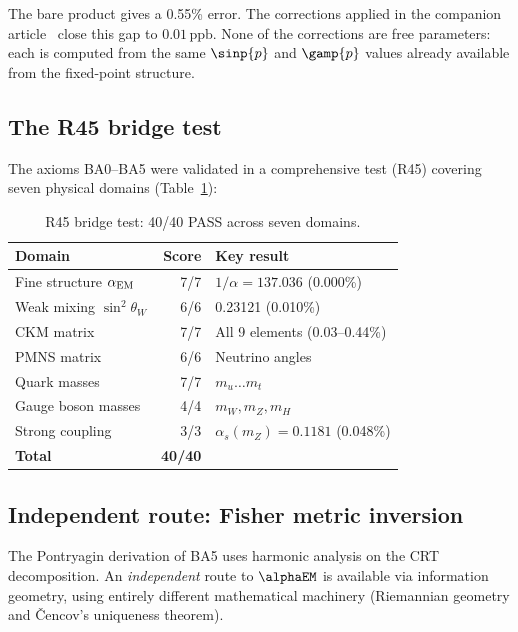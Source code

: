 \documentclass[12pt,a4paper]{article}
\begin{document}
The bare product gives a 0.55\% error. The corrections applied in
the companion article~\cite{companion_physics} close this gap to $0.01\,\mathrm{ppb}$. None of the corrections
are free parameters: each is computed from the same $\sinp{p}$ and
$\gamp{p}$ values already available from the fixed-point structure.

\subsection{The R45 bridge test}
\label{sec:ch9_R45}

The axioms BA0--BA5 were validated in a comprehensive test
(R45) covering seven physical domains (Table~\ref{tab:R45}):

\begin{table}[htbp]
\centering
\caption{R45 bridge test: 40/40 PASS across seven domains.}
\label{tab:R45}
\begin{tabular}{lrl}
\toprule
\textbf{Domain} & \textbf{Score} & \textbf{Key result} \\
\midrule
Fine structure $\alpha_{\rm EM}$ & 7/7 & $1/\alpha = 137.036$ (0.000\%) \\
Weak mixing $\sin^2\theta_W$ & 6/6 & 0.23121 (0.010\%) \\
CKM matrix & 7/7 & All 9 elements (0.03--0.44\%) \\
PMNS matrix & 6/6 & Neutrino angles \\
Quark masses & 7/7 & $m_u\ldots m_t$ \\
Gauge boson masses & 4/4 & $m_W, m_Z, m_H$ \\
Strong coupling & 3/3 & $\alpha_s(m_Z) = 0.1181$ (0.048\%) \\
\midrule
\textbf{Total} & \textbf{40/40} & \\
\bottomrule
\end{tabular}
\end{table}

\subsection{Independent route: Fisher metric inversion}
\label{sec:ch9_fisher_route}

The Pontryagin derivation of BA5 uses harmonic analysis on the CRT
decomposition. An \emph{independent} route to $\alphaEM$ is available
via information geometry, using entirely different mathematical
machinery (Riemannian geometry and \v{C}encov's uniqueness theorem).
\end{document}
